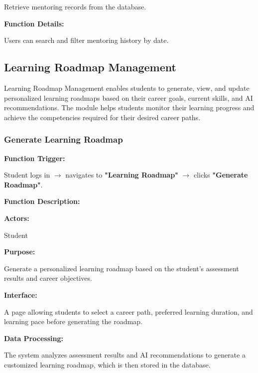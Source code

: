 Retrieve mentoring records from the database.

\vspace{0.3cm}

\textbf{Function Details:}

Users can search and filter mentoring history by date.


\subsection{Learning Roadmap Management}

Learning Roadmap Management enables students to generate, view, and update personalized learning roadmaps based on their career goals, current skills, and AI recommendations. The module helps students monitor their learning progress and achieve the competencies required for their desired career paths.
\subsubsection{Generate Learning Roadmap}

\textbf{Function Trigger:}

Student logs in $\rightarrow$ navigates to \textbf{"Learning Roadmap"} $\rightarrow$ clicks \textbf{"Generate Roadmap"}.

\vspace{0.3cm}

\textbf{Function Description:}

\textbf{Actors:}

Student

\vspace{0.2cm}

\textbf{Purpose:}

Generate a personalized learning roadmap based on the student's assessment results and career objectives.

\vspace{0.2cm}

\textbf{Interface:}

A page allowing students to select a career path, preferred learning duration, and learning pace before generating the roadmap.

\vspace{0.2cm}

\textbf{Data Processing:}

The system analyzes assessment results and AI recommendations to generate a customized learning roadmap, which is then stored in the database.

